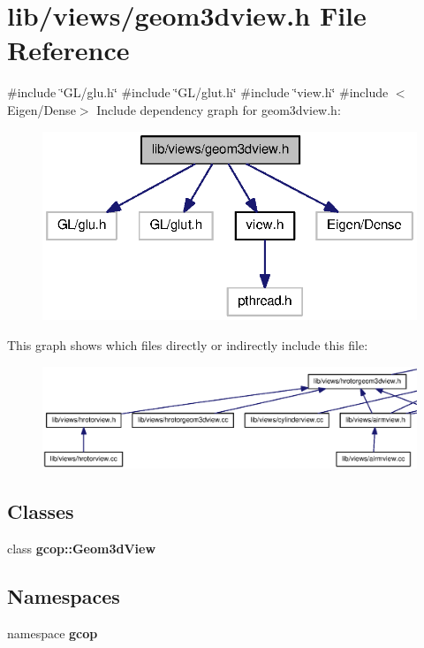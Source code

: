 \section{lib/views/geom3dview.h \-File \-Reference}
\label{geom3dview_8h}
{\ttfamily \#include \char`\"{}\-G\-L/glu.\-h\char`\"{}}\*
{\ttfamily \#include \char`\"{}\-G\-L/glut.\-h\char`\"{}}\*
{\ttfamily \#include \char`\"{}view.\-h\char`\"{}}\*
{\ttfamily \#include $<$\-Eigen/\-Dense$>$}\*
\-Include dependency graph for geom3dview.\-h\-:
\nopagebreak
\begin{figure}[H]
\begin{center}
\leavevmode
\includegraphics[width=322pt]{geom3dview_8h__incl}
\end{center}
\end{figure}
\-This graph shows which files directly or indirectly include this file\-:
\nopagebreak
\begin{figure}[H]
\begin{center}
\leavevmode
\includegraphics[width=350pt]{geom3dview_8h__dep__incl}
\end{center}
\end{figure}
\subsection*{\-Classes}
\begin{DoxyCompactItemize}
\item 
class {\bf gcop\-::\-Geom3d\-View}
\end{DoxyCompactItemize}
\subsection*{\-Namespaces}
\begin{DoxyCompactItemize}
\item 
namespace {\bf gcop}
\end{DoxyCompactItemize}
